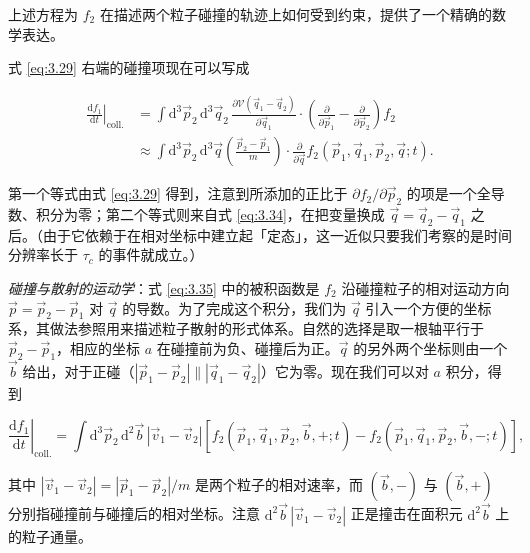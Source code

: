 上述方程为 $f_2$ 在描述两个粒子碰撞的轨迹上如何受到约束，提供了一个精确的数学表达。

式 \eqref{eq:3.29} 右端的碰撞项现在可以写成

\begin{equation}\label{eq:3.35}
  \begin{aligned}
    \left.\frac{\mathrm{d}f_1}{\mathrm{d}t}\right|_{\text{coll.}}&=\int \mathrm{d}^3\vec p_2\,\mathrm{d}^3\vec q_2\,\frac{\partial\mathscr V(\vec q_1-\vec q_2)}{\partial\vec q_1}\cdot\left(\frac{\partial}{\partial\vec p_1}-\frac{\partial}{\partial\vec p_2}\right)f_2\\
    &\approx\int \mathrm{d}^3\vec p_2\,\mathrm{d}^3\vec q\left(\frac{\vec p_2-\vec p_1}{m}\right)\cdot\frac{\partial}{\partial\vec q}f_2(\vec p_1,\vec q_1,\vec p_2,\vec q;t).
  \end{aligned}
\end{equation}

第一个等式由式 \eqref{eq:3.29} 得到，注意到所添加的正比于 $\partial f_2/\partial\vec p_2$ 的项是一个全导数、积分为零；第二个等式则来自式 \eqref{eq:3.34}，在把变量换成 $\vec q=\vec q_2-\vec q_1$ 之后。（由于它依赖于在相对坐标中建立起「定态」，这一近似只要我们考察的是时间分辨率长于 $\tau_c$ 的事件就成立。）

\emph{碰撞与散射的运动学}：式 \eqref{eq:3.35} 中的被积函数是 $f_2$ 沿碰撞粒子的相对运动方向 $\vec p=\vec p_2-\vec p_1$ 对 $\vec q$ 的导数。为了完成这个积分，我们为 $\vec q$ 引入一个方便的坐标系，其做法参照用来描述粒子散射的形式体系。自然的选择是取一根轴平行于 $\vec p_2-\vec p_1$，相应的坐标 $a$ 在碰撞前为负、碰撞后为正。$\vec q$ 的另外两个坐标则由一个 $\vec b$ 给出，对于正碰（$|\vec p_1-\vec p_2|\parallel|\vec q_1-\vec q_2|$）它为零。现在我们可以对 $a$ 积分，得到


\begin{equation}\label{eq:3.36}
  \left.\frac{\mathrm{d}f_1}{\mathrm{d}t}\right|_{\text{coll.}}=\int \mathrm{d}^3\vec p_2\,\mathrm{d}^2\vec b\,|\vec v_1-\vec v_2|\left[f_2(\vec p_1,\vec q_1,\vec p_2,\vec b,+;t)-f_2(\vec p_1,\vec q_1,\vec p_2,\vec b,-;t)\right],
\end{equation}

其中 $|\vec v_1-\vec v_2|=|\vec p_1-\vec p_2|/m$ 是两个粒子的相对速率，而 $(\vec b,-)$ 与 $(\vec b,+)$ 分别指碰撞前与碰撞后的相对坐标。注意 $\mathrm{d}^2\vec b\,|\vec v_1-\vec v_2|$ 正是撞击在面积元 $\mathrm{d}^2\vec b$ 上的粒子通量。

